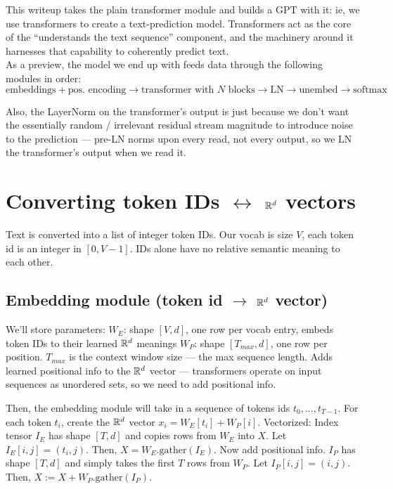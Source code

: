 \documentclass[12pt]{article}
\begin{document}
\pagebreak
\begin{outline}

This writeup takes the plain transformer module and builds a GPT with it: ie, we use transformers to create a text-prediction model. Transformers act as the core of the ``understands the text sequence'' component, and the machinery around it harnesses that capability to coherently predict text. \\

As a preview, the model we end up with feeds data through the following modules in order:
\[ \text{embeddings} + \text{pos. encoding} \rightarrow \text{transformer with $N$ blocks} \rightarrow \text{LN} \rightarrow \text{unembed} \rightarrow \text{softmax} \]

Also, the LayerNorm on the transformer's output is just because we don't want the essentially random / irrelevant residual stream magnitude to introduce noise to the prediction --- pre-LN norms upon every read, not every output, so we LN the transformer's output when we read it.

\section{Converting token IDs $\leftrightarrow$ $\mathbb{R}^d$ vectors}

Text is converted into a list of integer token IDs. Our vocab is size $V$, each token id is an integer in $[0,V-1]$. IDs alone have no relative semantic meaning to each other.

\subsection{Embedding module (token id $\rightarrow$ $\mathbb{R}^d$ vector)}

We'll store parameters:
\1 $W_E$: shape $[V,d]$, one row per vocab entry, embeds token IDs to their learned $\mathbb{R}^d$ meanings
\1 $W_P$: shape $[T_{max},d]$, one row per position. $T_{max}$ is the context window size --- the max sequence length. Adds learned positional info to the $\mathbb{R}^d$ vector --- transformers operate on input sequences as unordered sets, so we need to add positional info.
\\\0

Then, the embedding module will take in a sequence of tokens ids $t_0,...,t_{T-1}$. For each token $t_i$, create the $\mathbb{R}^d$ vector $x_i = W_E[t_i] + W_P[i]$. Vectorized:
\1 Index tensor $I_E$ has shape $[T,d]$ and copies rows from $W_E$ into $X$. Let $I_E[i,j] = (t_i, j)$. Then, $\boxed{X = W_E.\text{gather}(I_E)}$.
\1 Now add positional info. $I_P$ has shape $[T,d]$ and simply takes the first $T$ rows from $W_P$. Let $I_P[i,j] = (i,j)$. Then, $\boxed{X := X + W_P.\text{gather}(I_P)}$.
\\\0


\end{outline}
\end{document}
